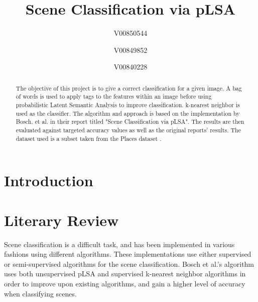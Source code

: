 \documentclass[conference]{IEEEtran}
\begin{document}
\title{
Scene Classification via pLSA
}

\author{
V00850544\\
\and
{}
V00849852\\
\and
{}
V00840228\\
}

\maketitle

\begin{abstract}
The objective of this project is to give a correct classification for a given image. A bag of words is used to apply tags to the features within an image before using probabilistic Latent Semantic Analysis to improve classification.  k-nearest neighbor is used as the classifier. The algorithm and approach is based on the implementation by Bosch. et al. \cite{bosch} in their report titled "Scene Classification via pLSA". The results are then evaluated against targeted accuracy values as well as the original reports' results. The dataset used is a subset taken from the Places dataset \cite{places}.
\end{abstract}

\section{Introduction}

\section{Literary Review}
Scene classification is a difficult task, and has been implemented in various fashions using different algorithms. These implementations use either supervised or semi-supervised algorithms for the scene classification. Bosch et al.'s algorithm \cite{bosch} uses both unsupervised pLSA and supervised k-nearest neighbor algorithms in order to improve upon existing algorithms, and gain a higher level of accuracy when classifying scenes. \\
\end{document}
